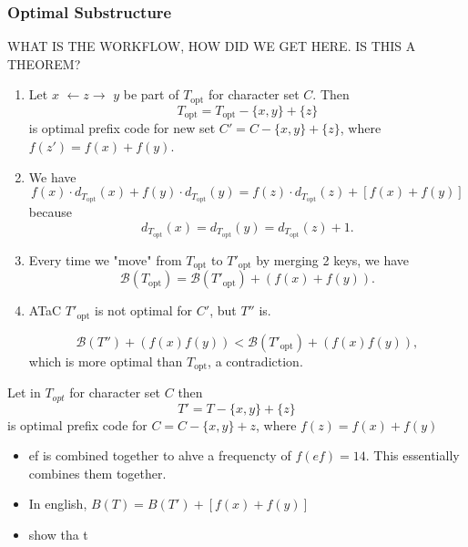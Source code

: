 \subsubsection{Optimal Substructure}
WHAT IS THE WORKFLOW, HOW DID WE GET HERE. IS THIS A THEOREM?
\begin{theorem}
    \begin{enumerate}
        \item Let \( x \) $\leftarrow z \rightarrow$ \( y \) be part of \( T_{\text{opt}} \) for character set \( C \). Then
        \[
        T_{\text{opt}} = T_{\text{opt}} - \{x, y\} + \{z\}
        \]
        is optimal prefix code for new set \( C' = C - \{x, y\} + \{z\} \), where \( f(z') = f(x) + f(y) \).
    
        \item We have
        \[
        f(x) \cdot d_{T_{\text{opt}}}(x) + f(y) \cdot d_{T_{\text{opt}}}(y) = f(z) \cdot d_{T_{\text{opt}}}(z) + [f(x) + f(y)]
        \]
        because 
        \[
        d_{T_{\text{opt}}}(x) = d_{T_{\text{opt}}}(y) = d_{T_{\text{opt}}}(z) + 1.
        \]
    
        \item Every time we "move" from \( T_{\text{opt}} \) to \( T'_{\text{opt}} \) by merging 2 keys, we have
        \[
        \mathcal{B}(T_{\text{opt}}) = \mathcal{B}(T'_{\text{opt}}) + (f(x) + f(y)).
        \]
    
        \item ATaC \( T'_{\text{opt}} \) is not optimal for \( C' \), but \( T'' \) is. 
    
        \[
        \mathcal{B}(T'') + (f(x) f(y)) < \mathcal{B}(T'_{\text{opt}}) + (f(x) f(y)),
        \]
        which is more optimal than \( T_{\text{opt}} \), a contradiction.
    \end{enumerate}

\end{theorem}

\begin{derivation}
    Let in $T_{opt}$ for character set $C$ then 
    \begin{equation*}
        T' = T - \{x,y\} + \{z\}
    \end{equation*}
    is optimal prefix code for $C = C - \{x,y\} + {z}$, where $f(z) = f(x) + f(y)$
    \begin{itemize}
        \item ef is combined together to ahve a frequencty of $f(ef) = 14$. This essentially combines them together. 
        \item In english, $B(T) = B(T') + [f(x) + f(y)]$
        \item show tha t 
    \end{itemize}
\end{derivation}